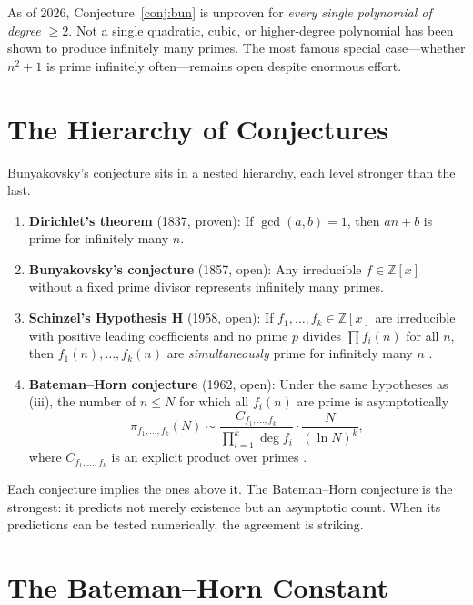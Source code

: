 \documentclass[11pt,a4paper]{article}
\newcommand{\Z}{\mathbb{Z}}
\begin{document}
As of 2026, Conjecture~\ref{conj:bun} is unproven for \emph{every single polynomial of degree $\geq 2$}. Not a single quadratic, cubic, or higher-degree polynomial has been shown to produce infinitely many primes. The most famous special case---whether $n^2 + 1$ is prime infinitely often---remains open despite enormous effort.

\section{The Hierarchy of Conjectures}

Bunyakovsky's conjecture sits in a nested hierarchy, each level stronger than the last.

\begin{enumerate}[label=(\roman*)]
    \item \textbf{Dirichlet's theorem} (1837, proven): If $\gcd(a,b) = 1$, then $an + b$ is prime for infinitely many $n$.
    \item \textbf{Bunyakovsky's conjecture} (1857, open): Any irreducible $f \in \Z[x]$ without a fixed prime divisor represents infinitely many primes.
    \item \textbf{Schinzel's Hypothesis H} (1958, open): If $f_1, \ldots, f_k \in \Z[x]$ are irreducible with positive leading coefficients and no prime $p$ divides $\prod f_i(n)$ for all $n$, then $f_1(n), \ldots, f_k(n)$ are \emph{simultaneously} prime for infinitely many $n$ \cite{schinzel1958}.
    \item \textbf{Bateman--Horn conjecture} (1962, open): Under the same hypotheses as (iii), the number of $n \leq N$ for which all $f_i(n)$ are prime is asymptotically
    \begin{equation}\label{eq:bh}
        \pi_{f_1,\ldots,f_k}(N) \sim \frac{C_{f_1,\ldots,f_k}}{\prod_{i=1}^k \deg f_i} \cdot \frac{N}{(\ln N)^k},
    \end{equation}
    where $C_{f_1,\ldots,f_k}$ is an explicit product over primes \cite{bateman1962}.
\end{enumerate}

Each conjecture implies the ones above it. The Bateman--Horn conjecture is the strongest: it predicts not merely existence but an asymptotic count. When its predictions can be tested numerically, the agreement is striking.

\section{The Bateman--Horn Constant}
\end{document}
